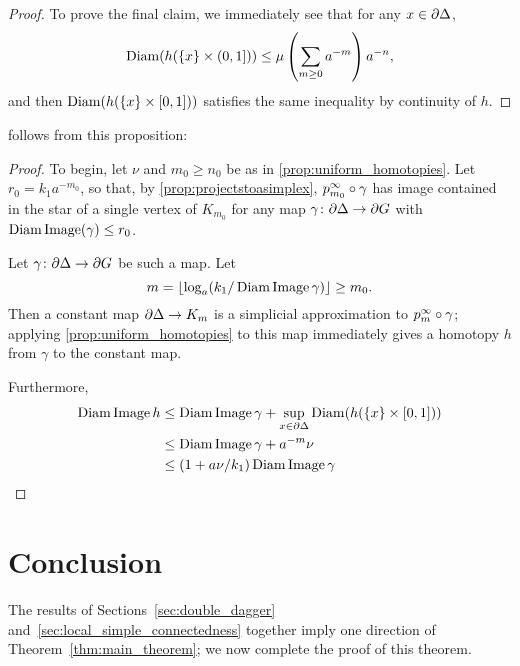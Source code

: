 \documentclass[a4paper]{article}
\begin{document}
\begin{proof}
  To prove the final claim, we immediately see that for any $x \in
  \partial\Delta$,
  \begin{equation*}
    \operatorname{Diam}(h(\{x\}\times (0,1])) 
            \leq \mu \left(\sum_{m\geq 0} a^{-m}\right)a^{-n},
  \end{equation*}
  and then $\operatorname{Diam}(h(\{x\}\times [0,1]))$ satisfies the same inequality by
  continuity of $h$.
\end{proof}

 follows from this proposition:

\ddagimpliesLCtwo*

\begin{proof}
  To begin, let $\nu$ and $m_0 \geq n_0$ be as in
  \cref{prop:uniform_homotopies}. Let $r_0 =
  k_1a^{-m_0}$, so that, by \cref{prop:projectstoasimplex},
  $p^\infty_{m_0}\circ\gamma$ has image contained in the star of a single
  vertex of $K_{m_0}$ for any map $\gamma\colon\partial\Delta\to\partial
  G$ with $\operatorname{Diam}\operatorname{Image}(\gamma)\leq r_0$.

  Let $\gamma\colon\partial\Delta\to\partial G$ be such a map. Let 
  \begin{equation*}
    m = \lfloor\log_a(k_1/\operatorname{Diam}\operatorname{Image}\gamma)\rfloor \geq m_0.
  \end{equation*}
  Then a constant map $\partial\Delta \to K_m$ is a simplicial approximation
  to $p^\infty_m\circ\gamma$; applying \cref{prop:uniform_homotopies} to
  this map immediately gives a homotopy $h$ from $\gamma$ to the constant map.

  Furthermore,
  \begin{align*}
    \operatorname{Diam}\operatorname{Image} h &\leq \operatorname{Diam}\operatorname{Image}\gamma + \sup_{x \in\partial\Delta}
                                    \operatorname{Diam}(h(\{x\} \times [0,1])) \\
                  &\leq \operatorname{Diam}\operatorname{Image}\gamma + a^{-m} \nu \\
                  &\leq (1 + a\nu/k_1) \operatorname{Diam}\operatorname{Image}\gamma \qedhere
  \end{align*}
\end{proof}

\section{Conclusion}\label{sec:conclusion}

The results of Sections~\ref{sec:double_dagger}
and~\ref{sec:local_simple_connectedness} together imply one direction of
Theorem~\ref{thm:main_theorem}; we now complete the proof of this theorem.
\end{document}

